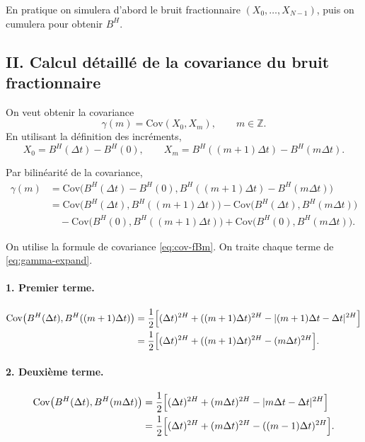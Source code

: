 \documentclass[11pt,a4paper]{article}
\newcommand{\Cov}{\mathrm{Cov}}
\newcommand{\1}{\mathbf{1}}
\newcommand{\bH}{B^{H}}
\begin{document}
En pratique on simulera d'abord le bruit fractionnaire $(X_0,\dots,X_{N-1})$, puis
on cumulera pour obtenir $\bH$.

\subsection*{II. Calcul détaillé de la covariance du bruit fractionnaire}

On veut obtenir la covariance
\[
  \gamma(m) = \Cov(X_0,X_m),
  \qquad m\in\mathbb{Z}.
\]
En utilisant la définition des incréments,
\[
  X_0 = \bH(\Delta t) - \bH(0),
  \qquad
  X_m = \bH((m+1)\Delta t) - \bH(m\Delta t).
\]

Par bilinéarité de la covariance,
\begin{align}
  \gamma(m)
  &= \Cov\bigl(\bH(\Delta t)-\bH(0),
               \bH((m+1)\Delta t)-\bH(m\Delta t)\bigr) \\[0.3em]
  &= \Cov\bigl(\bH(\Delta t),\bH((m+1)\Delta t)\bigr)
   - \Cov\bigl(\bH(\Delta t),\bH(m\Delta t)\bigr) \nonumber\\
  &\quad - \Cov\bigl(\bH(0),\bH((m+1)\Delta t)\bigr)
   + \Cov\bigl(\bH(0),\bH(m\Delta t)\bigr). \label{eq:gamma-expand}
\end{align}

On utilise la formule de covariance \eqref{eq:cov-fBm}. On traite
chaque terme de \eqref{eq:gamma-expand}.

\paragraph{1. Premier terme.}
\begin{align}
  \Cov\bigl(\bH(\Delta t),\bH((m+1)\Delta t)\bigr)
  &= \frac{1}{2}\Bigl[(\Delta t)^{2H}
  + ((m+1)\Delta t)^{2H}
  - |(m+1)\Delta t - \Delta t|^{2H}\Bigr] \\
  &= \frac{1}{2}\Bigl[(\Delta t)^{2H}
  + ((m+1)\Delta t)^{2H}
  - (m\Delta t)^{2H}\Bigr].
\end{align}

\paragraph{2. Deuxième terme.}
\begin{align}
  \Cov\bigl(\bH(\Delta t),\bH(m\Delta t)\bigr)
  &= \frac{1}{2}\Bigl[(\Delta t)^{2H}
  + (m\Delta t)^{2H}
  - |m\Delta t - \Delta t|^{2H}\Bigr] \\
  &= \frac{1}{2}\Bigl[(\Delta t)^{2H}
  + (m\Delta t)^{2H}
  - ((m-1)\Delta t)^{2H}\Bigr].
\end{align}
\end{document}
